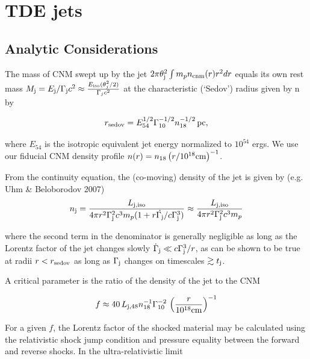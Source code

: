\documentclass[usenatbib,fleqn]{mnras}
\begin{document}
\section{TDE jets}
\label{sec:jet}

\subsection{Analytic Considerations}
\label{sec:analytic}


The mass of CNM swept up by the jet $2\pi\theta_{\rm j}^{2}\int m_p
n_{\rm cnm}(r) r^{2}dr$ equals its own rest mass $M_{\rm j} = E_{\rm
  j}/\Gamma_{\rm j}c^{2} \approx \frac{E_{\rm iso}
  (\theta_j^2/2)}{\Gamma_j c^2} $ at the characteristic (`Sedov')
radius given by
n by

\begin{equation}
r_{\rm sedov} = E_{54}^{1/2} \Gamma_{10}^{-1/2} n_{\rm 18}^{-1/2}\,{\rm pc}, 
\end{equation}

where $E_{54}$ is the isotropic equivalent jet energy normalized to
$10^{54}$ ergs. We use our fiducial CNM density profile $n(r)=n_{18}
\left(r/10^{18} {\rm cm}\right)^{-1}$.

From the continuity equation, the (co-moving) density of the jet is
given by (e.g. Uhm \& Beloborodov 2007)
 \begin{align}
   n_{\rm j} =  \frac{L_{\rm j, iso}}{4 \pi r^{2}\Gamma_{\rm
       j}^{2}c^{3}m_p(1 + r \dot{\Gamma_{\rm j}}/c\Gamma_{\rm j}^{3})}
   \approx  \frac{L_{\rm j, iso}}{4 \pi r^{2}\Gamma_{\rm j}^{2}c^{3}m_p}
\end{align}

where the second term in the denominator is generally negligible as
long as the Lorentz factor of the jet changes slowly
$\dot{\Gamma}_{\rm j} \ll c\Gamma_{\rm j}^{3}/r$, as can be shown to
be true at radii $r < r_{\rm sedov}$ as long as $\Gamma_{\rm j}$
changes on timescales $\gtrsim t_{\rm j}$.

A critical parameter is the ratio of the density of the jet to the
CNM

\begin{equation}
  f\approx 40\,  L_{\rm j,48} n_{18}^{-1} \Gamma_{10}^{-2} \, \left(\frac{r}{10^{18} {\rm
        cm}}\right)^{-1} 
\end{equation}

For a given $f$, the Lorentz factor of the shocked material may be
calculated using the relativistic shock jump condition and pressure
equality between the forward and reverse shocks. In the
ultra-relativistic limit
\end{document}
